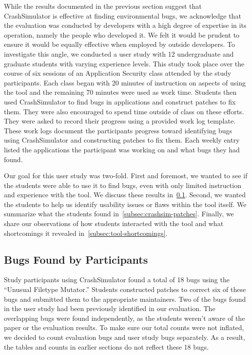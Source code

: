While the results documented in the previous section suggest that CrashSimulator
is effective at finding environmental bugs, we acknowledge that the evaluation
was conducted by developers with a high degree of expertise in its operation,
namely the people who developed it.  We felt it would be prudent to ensure it
would be equally effective when employed by outside developers.
To investigate this angle,
we conducted a user study
with 12 undergraduate and graduate students with varying experience levels.
This study took place over the course of six sessions
of an Application Security class attended by the study participants.
Each class began with 20
minutes of instruction on aspects of using the tool
and the remaining 70 minutes were used as work time. Students then used
CrashSimulator to find bugs in applications and construct patches to fix
them.  They were also encouraged to spend time outside
of class on these efforts.  They were asked to record their progress
using a provided work log template.  These work logs document the participants
progress toward identifying bugs using CrashSimulator and constructing patches
to fix them.  Each weekly entry listed the applications the participant was
working on and what bugs they had found.

Our goal for this user study was two-fold.  First and foremost,
we wanted to see if the students were able to use it to find bugs,
even with only limited instruction and experience with the tool.
We discuss these results in~\ref{subsec:bugs-by-participants}.
Second, we wanted the students to help us identify usability issues
or flaws within the tool itself.  We summarize what the students found
in~\ref{subsec:crashsim-patches}.  Finally, we share our observations
of how students interacted with the tool and what shortcomings
it revealed in~\ref{subsec:tool-shortcomings}.

\subsection{Bugs Found by Participants}
\label{subsec:bugs-by-participants}
Study participants using CrashSimulator found a total of 18 bugs
using the ``Unusual Filetype Mutator.''
Students constructed patches to correct six of these bugs and submitted
them to the appropriate maintainers.
Two of the bugs found in the user study
had been previously identified
in our evaluation.
The overlapping bugs were found independently,
as the students weren’t aware of the paper or the evaluation results.
To make sure our total counts were not inflated,
we decided to count evaluation bugs and user study bugs separately.
As a result, the tables and counts in earlier
sections do not reflect these 18 bugs.

